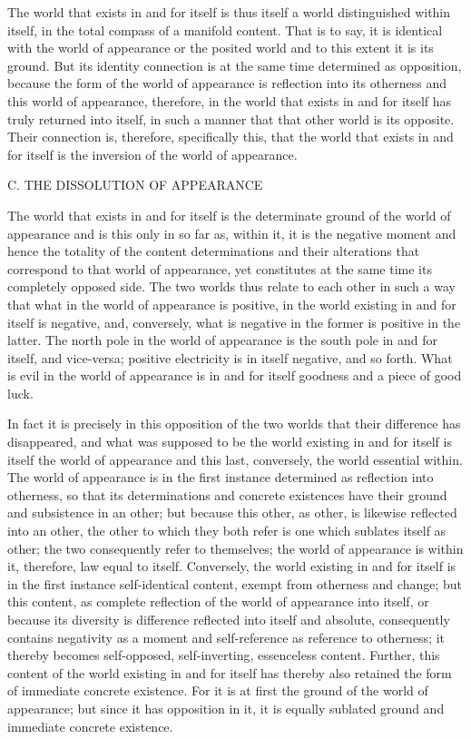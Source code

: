 The world that exists in and for itself is
thus itself a world distinguished within itself,
in the total compass of a manifold content.
That is to say, it is identical with the world of appearance
or the posited world and to this extent it is its ground.
But its identity connection is at the same time
determined as opposition,
because the form of the world of appearance is
reflection into its otherness
and this world of appearance, therefore, in the
world that exists in and for itself
has truly returned into itself,
in such a manner that
that other world is its opposite.
Their connection is, therefore, specifically this,
that the world that exists in and for itself is
the inversion of the world of appearance.

C. THE DISSOLUTION OF APPEARANCE

The world that exists in and for itself is
the determinate ground of the world of appearance
and is this only in so far as, within it,
it is the negative moment
and hence the totality of the content determinations
and their alterations that correspond to that world of appearance,
yet constitutes at the same time its completely opposed side.
The two worlds thus relate to each other in such a way
that what in the world of appearance is positive,
in the world existing in and for itself is negative,
and, conversely, what is negative in the former
is positive in the latter.
The north pole in the world of appearance
is the south pole in and for itself, and vice-versa;
positive electricity is in itself negative, and so forth.
What is evil in the world of appearance is
in and for itself goodness and a piece of good luck.

In fact it is precisely in this opposition
of the two worlds that their difference has disappeared,
and what was supposed to be
the world existing in and for itself is
itself the world of appearance
and this last, conversely,
the world essential within.
The world of appearance is in the first instance
determined as reflection into otherness,
so that its determinations and concrete existences have
their ground and subsistence in an other;
but because this other, as other,
is likewise reflected into an other,
the other to which they both refer is
one which sublates itself as other;
the two consequently refer to themselves;
the world of appearance is within it,
therefore, law equal to itself.
Conversely, the world existing in and for itself is
in the first instance self-identical content,
exempt from otherness and change;
but this content, as complete reflection of
the world of appearance into itself,
or because its diversity is difference
reflected into itself and absolute,
consequently contains negativity as a moment
and self-reference as reference to otherness;
it thereby becomes self-opposed, self-inverting, essenceless content.
Further, this content of the world existing in and for itself has
thereby also retained the form of immediate concrete existence.
For it is at first the ground of the world of appearance;
but since it has opposition in it, it is equally
sublated ground and immediate concrete existence.

